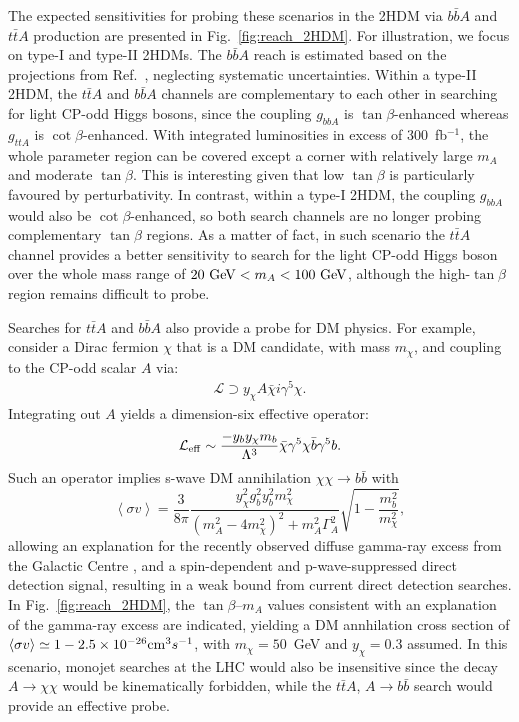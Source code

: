 \documentclass[preprintnumbers,superscriptaddress,nofootinbib,aps,prd,floatfix]{revtex4}
\begin{document}
The expected sensitivities for probing these scenarios in the 2HDM via $b\bar bA$ and $t\bar{t}A$ production are presented in Fig.~\ref{fig:reach_2HDM}. For illustration, we focus on type-I and type-II 2HDMs. The $b\bar{b}A$ reach is estimated based on the projections from Ref.~\cite{Kozaczuk:2015bea}, neglecting
systematic uncertainties. Within a type-II  2HDM, the $t\bar{t}A$ and $b\bar{b}A$ channels are complementary to each other in searching for light CP-odd Higgs bosons, since the coupling $g_{bbA}$ is $\tan\beta$-enhanced whereas $g_{ttA}$ is $\cot \beta$-enhanced. With integrated luminosities in excess of 300~fb$^{-1}$, the whole parameter region can be covered except a corner with relatively large $m_A$ and moderate $\tan\beta$. This is interesting given that low $\tan\beta$ is particularly favoured by perturbativity. In contrast, within a type-I 2HDM, the coupling $g_{bbA}$ would also be $\cot\beta$-enhanced, so both search channels are no longer probing complementary $\tan\beta$ regions. As a matter of fact, in such scenario the $t\bar{t}A$ channel provides a better sensitivity to search for the light CP-odd Higgs boson over the whole mass range of $20~{\rm GeV} < m_A < 100~{\rm GeV}$, although the high-$\tan\beta$ region remains difficult to probe. 

Searches for $t\bar {t}A$ and $b\bar {b} A$ also provide a probe for DM physics. For example, consider a Dirac fermion $\chi$ that is a DM candidate, with mass $m_\chi$, and coupling to the CP-odd scalar $A$ via:
\begin{eqnarray}
\mathcal {L} \supset y_\chi A \bar \chi i  \gamma^5 \chi.
\end{eqnarray}
Integrating out $A$ yields a dimension-six effective operator:
\begin{eqnarray}
\mathcal {L}_{\rm eff} \sim  \frac{- y_b y_\chi m_b   }{\Lambda^3} \bar \chi   \gamma^5 \chi \bar b   \gamma^5 b.
\end{eqnarray}
Such an operator implies s-wave DM annihilation $\chi \chi \to b\bar{b}$ with
\begin{equation}
\left < \sigma v \right > = \frac{3}{8 \pi} \frac{y^2_\chi g_b^2 y_b^2 m_{\chi}^2}{(m_A^2 - 4 m_{\chi}^2)^2 + m_A^2 \Gamma_A^2} \sqrt{1-\frac{m_b^2}{m_\chi^2}},
\label{eq:anhil}
\end{equation}
allowing an explanation for the recently observed diffuse gamma-ray excess from the Galactic Centre \cite{Goodenough:2009gk,Vitale:2009hr},  and a spin-dependent and p-wave-suppressed direct detection signal, resulting in a weak bound from current direct detection searches. In Fig.~\ref{fig:reach_2HDM}, the $\tan\beta$--$m_A$ values consistent with an explanation of the gamma-ray excess are indicated, yielding a DM annhilation cross section of $\langle \sigma v \rangle  \simeq 1-2.5 \times 10^{-26} {\rm cm}^3 {\rm} s^{-1}$, with $m_{\chi}=50$~GeV \cite{Calore:2014nla} and  $y_\chi= 0.3$ assumed.  
In this scenario, monojet searches at the LHC would also be insensitive since the decay $A \to \chi \chi$ would be kinematically forbidden, while the $t\bar {t}A$, $A \to b\bar{b}$ search would provide an effective probe.
\end{document}

